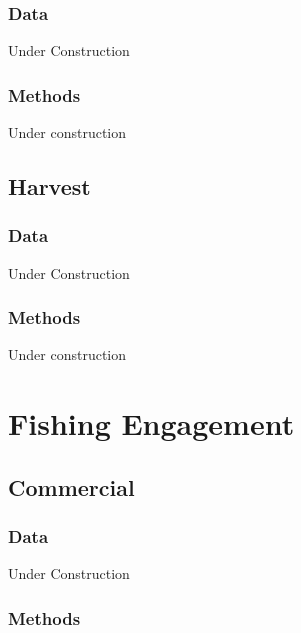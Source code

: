 \documentclass[
]{book}
\begin{document}
\hypertarget{data-15}{%
\subsection{Data}\label{data-15}}

Under Construction

\hypertarget{methods-15}{%
\subsection{Methods}\label{methods-15}}

Under construction

\hypertarget{harvest}{%
\section{Harvest}\label{harvest}}

\hypertarget{data-16}{%
\subsection{Data}\label{data-16}}

Under Construction

\hypertarget{methods-16}{%
\subsection{Methods}\label{methods-16}}

Under construction

\hypertarget{fishing-engagement}{%
\chapter{Fishing Engagement}\label{fishing-engagement}}

\hypertarget{commercial}{%
\section{Commercial}\label{commercial}}

\hypertarget{data-17}{%
\subsection{Data}\label{data-17}}

Under Construction

\hypertarget{methods-17}{%
\subsection{Methods}\label{methods-17}}
\end{document}
